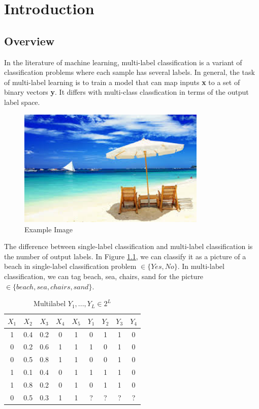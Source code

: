 
\chapter{Introduction} %
\label{Chapter5}

\section{Overview}

In the literature of machine learning, multi-label classification is a variant of classification problems where each sample has several labels. In general, the task of multi-label learning is to train a model that can map inputs \textbf{x} to a set of binary vectors \textbf{y}. It differs with multi-class classfication in terms of the output label space.

\graphicspath{ {./Figures/} }
\begin{figure}[!htb]
    \centering
	\includegraphics[width=0.8\textwidth]{beach.jpg}
    \caption{Example Image}%
    \label{fig:MultilableImage}%
\end{figure}

The difference between single-label classification and multi-label classification is the number of output labels. In Figure \ref{fig:MultilableImage}, we can classify it as a picture of a beach in single-label classification problem $\in \{Yes, No\}$. In multi-label classification, we can tag beach, sea, chairs, sand for the picture $\in \{beach, sea, chairs, sand\}$.

\begin{table}
\centering
\begin{tabular}{|c c c c c | c c c c|}
\hline
$X_{1}$ & $X_{2}$ &  $X_{3}$ & $X_{4}$ & $X_{5}$ & $Y_{1}$ & $Y_{2}$ & $Y_{3}$ & $Y_{4}$ \\
\hline
1 & 0.4 & 0.2 & 0 & 1 & 0 & 1 & 1 & 0 \\
0 & 0.2 & 0.6 & 1 & 1 & 1 & 0 & 1 & 0 \\
0 & 0.5 & 0.8 & 1 & 1 & 0 & 0 & 1 & 0 \\
1 & 0.1 & 0.4 & 0 & 1 & 1 & 1 & 1 & 0 \\
1 & 0.8 & 0.2 & 0 & 1 & 0 & 1 & 1 & 0 \\
\hline
0 & 0.5 & 0.3 & 1 & 1 & ? & ? & ? & ? \\
\hline
\end{tabular}
\caption{Multilabel $Y_{1},...,Y_{L} \in 2^L$}
\label{tab:MultilabelTable}
\end{table}

